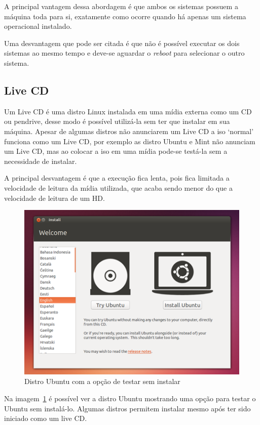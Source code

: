 \documentclass{handout_utfpr}
\begin{document}
A principal vantagem dessa abordagem é que ambos os sistemas possuem a máquina toda para si, exatamente como ocorre quando há apenas um sistema operacional instalado.

Uma desvantagem que pode ser citada é que não é possível executar os dois sistemas ao mesmo tempo e deve-se aguardar o \textit{reboot} para selecionar o outro sistema.


\subsection{Live CD}

Um Live CD é uma distro Linux instalada em uma mídia externa como um CD ou pendrive, desse modo é possível utilizá-la sem ter que instalar em sua máquina. Apesar de algumas distros não anunciarem  um Live CD a iso `normal' funciona como um Live CD, por exemplo as distro Ubuntu e Mint não anunciam um Live CD, mas ao colocar a iso em uma mídia pode-se testá-la sem a necessidade de instalar.

A principal desvantagem é que a execução fica lenta, pois fica limitada a velocidade de leitura da mídia utilizada, que acaba sendo menor do que a velocidade de leitura de um HD.

\begin{figure}[!h]
  \centering
  \includegraphics[scale=.5]{imagens/ubuntu-livecd.png}
  \caption{Distro Ubuntu com a opção de testar sem instalar}
  \label{fig:ubuntu-live}
\end{figure}

Na imagem~\ref{fig:ubuntu-live} é possível ver a distro Ubuntu mostrando uma opção para testar o Ubuntu sem instalá-lo. Algumas distros permitem instalar mesmo após ter sido iniciado como um live CD.
\end{document}
